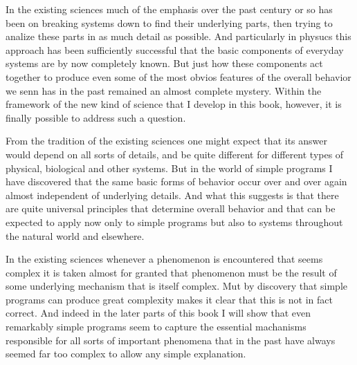 In the existing sciences much of the emphasis over the past
century or so has been on breaking systems down to find their
underlying parts, then trying to analize these parts in as much detail as
possible. And particularly in physucs this approach has been sufficiently
successful that the basic components of everyday systems are by now
completely known. But just how these components act together to
produce even some of the most obvios features of the overall behavior
we senn has in the past remained an almost complete mystery. Within
the framework of the new kind of science that I develop in this book,
however, it is finally possible to address such a question.

From the tradition of the existing sciences one might expect that
its answer would depend on all sorts of details, and be quite different for
different types of physical, biological and other systems. But in the
world of simple programs I have discovered that the same basic forms of
behavior occur over and over again almost independent of underlying
details. And what this suggests is that there are quite universal
principles that determine overall behavior and that can be expected to
apply now only to simple programs but also to systems throughout the
natural world and elsewhere.

In the existing sciences whenever a phenomenon is encountered
that seems complex it is taken almost for granted that phenomenon
must be the result of some underlying mechanism that is itself
complex. Mut by discovery that simple programs can produce great
complexity makes it clear that this is not in fact correct. And indeed in
the later parts of this book I will show that even remarkably simple
programs seem to capture the essential machanisms responsible for all
sorts of important phenomena that in the past have always seemed far
too complex to allow any simple explanation.



